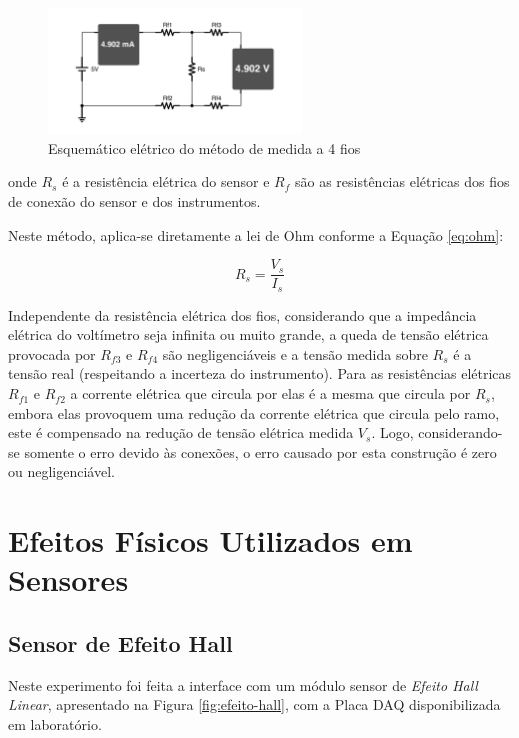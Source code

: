 \documentclass[a4paper]{instrumentacao}
\begin{document}
\begin{figure}[H]
\centering
\includegraphics[width=0.6\textwidth]{4WireMeasure.pdf}
\caption{Esquemático elétrico do método de medida a 4 fios}
\label{fig:4wire-circuit}
\end{figure}

\noindent onde $R_s$ é a resistência elétrica do sensor e $R_f$ são as resistências elétricas dos fios de conexão do sensor e dos instrumentos.

Neste método, aplica-se diretamente a lei de Ohm conforme a Equação \ref{eq:ohm}:

\begin{equation}
	R_s = \frac{V_s}{I_s}
	\label{eq:ohm}
\end{equation}

Independente da resistência elétrica dos fios, considerando que a impedância elétrica do voltímetro seja infinita ou muito grande, a queda de tensão elétrica provocada por $R_{f3}$ e $R_{f4}$ são negligenciáveis e a tensão medida sobre $R_s$ é a tensão real (respeitando a incerteza do instrumento). Para as resistências elétricas $R_{f1}$ e $R_{f2}$ a corrente elétrica que circula por elas é a mesma que circula por $R_s$, embora elas provoquem uma redução da corrente elétrica que circula pelo ramo, este é compensado na redução de tensão elétrica medida $V_s$. Logo, considerando-se somente o erro devido às conexões, o erro causado por esta construção é zero ou negligenciável.

\section{Efeitos Físicos Utilizados em Sensores}

\subsection{Sensor de Efeito Hall}
Neste experimento foi feita a interface com um módulo sensor de \textit{Efeito Hall Linear}, apresentado na Figura \ref{fig:efeito-hall}, com a Placa DAQ disponibilizada em laboratório.
\end{document}
